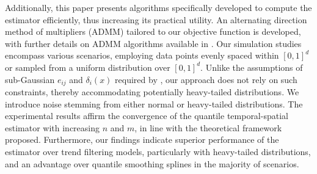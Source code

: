 \documentclass[twoside,11pt]{article}
\begin{document}






Additionally, this paper presents algorithms specifically developed to compute the estimator efficiently, thus increasing its practical utility. An alternating direction method of multipliers (ADMM) tailored to our objective function is developed, with further details on ADMM algorithms available in \cite{boyd2011distributed}. Our simulation studies encompass various scenarios, employing data points evenly spaced within $[0,1]^d$ or sampled from a uniform distribution over $[0,1]^d$. Unlike the assumptions of sub-Gaussian $e_{ij}$ and $\delta_i(x)$ required by \cite{padilla2023temporal}, our approach does not rely on such constraints, thereby accommodating potentially heavy-tailed distributions. We introduce noise stemming from either normal or heavy-tailed distributions. The experimental results affirm the convergence of the quantile temporal-spatial estimator with increasing $n$ and $m$, in line with the theoretical framework proposed. Furthermore, our findings indicate superior performance of the estimator over trend filtering models, particularly with heavy-tailed distributions, and an advantage over quantile smoothing splines in the majority of scenarios.
\end{document}
